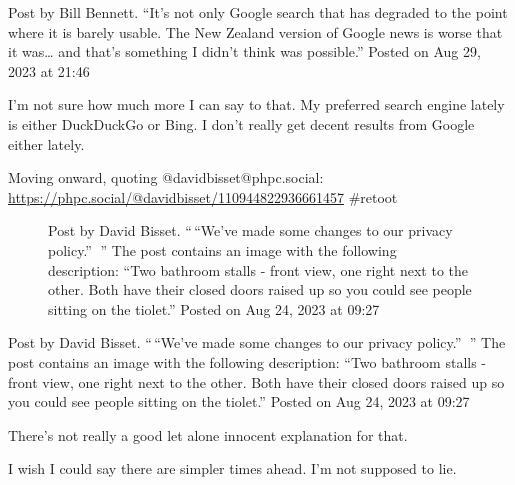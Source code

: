 Post by Bill Bennett. ``It's not only Google search that has degraded to
the point where it is barely usable. The New Zealand version of Google
news is worse that it was\ldots{} and that's something I didn't think
was possible.'' Posted on Aug 29, 2023 at 21:46

I'm not sure how much more I can say to that. My preferred search engine
lately is either DuckDuckGo or Bing. I don't really get decent results
from Google either lately.

Moving onward, quoting @davidbisset@phpc.social:
\url{https://phpc.social/@davidbisset/110944822936661457} \#retoot

\begin{figure}
\centering
{}
\caption{Post by David Bisset. ``\,``We've made some changes to our
privacy policy.'' 🤔'' The post contains an image with the following
description: ``Two bathroom stalls - front view, one right next to the
other. Both have their closed doors raised up so you could see people
sitting on the tiolet.'' Posted on Aug 24, 2023 at 09:27}
\end{figure}

Post by David Bisset. ``\,``We've made some changes to our privacy
policy.'' 🤔'' The post contains an image with the following
description: ``Two bathroom stalls - front view, one right next to the
other. Both have their closed doors raised up so you could see people
sitting on the tiolet.'' Posted on Aug 24, 2023 at 09:27

There's not really a good let alone innocent explanation for that.

I wish I could say there are simpler times ahead. I'm not supposed to
lie.
